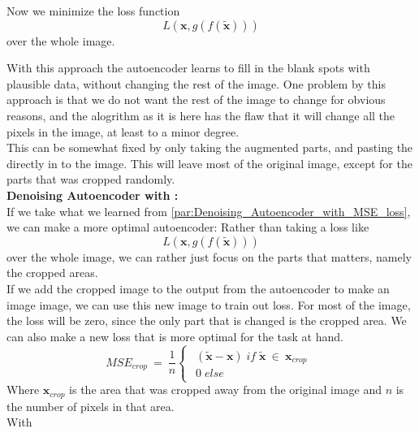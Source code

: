 	Now we minimize the loss function\\	
	  \begin{equation}
	    L(\textbf{x},g(f(\widetilde{\textbf{x}})))
	  \end{equation}
	over the whole image.\\
	\vspace{20px}
	
	With this approach the autoencoder learns to fill in the blank spots with plausible data, without changing the rest of the image. 
	One problem by this approach is that we do not want the rest of the image to change for obvious reasons, and the alogrithm as it is here has the flaw that it will change all the pixels in the image, at 
	least to a minor degree. \\
	
	This can be somewhat fixed by only taking the augmented parts, and pasting the directly in to the image. This will leave most of the original image, except for the parts that was cropped randomly.\\
	
	\vspace{10px}
	\textbf{Denoising Autoencoder with :}\\
	If we take what we learned from \ref{par:Denoising_Autoencoder_with_MSE_loss}, we can make a more optimal autoencoder:
	Rather than taking a loss like 	
	\begin{equation}
	  L(\textbf{x},g(f(\widetilde{\textbf{x}})))
	\end{equation}
	over the whole image, we can rather just focus on the parts that matters, namely the cropped areas.\\
	
	If we add the cropped image to the output from the autoencoder to make an image image, we can use this new image to train out loss.
	For most of the image, the loss will be zero, since the only part that is changed is the cropped area. 
	We can also make a new loss that is more optimal for the task at hand. 
	\begin{equation}
	  MSE_{crop}\:=\: \frac{1}{n}
	  \begin{cases}
	      \begin{array}{lcl}
	      (\widetilde{\textbf{x}}-\textbf{x}) \; if \; \widetilde{\textbf{x}} \: \in \: \textbf{x}_{crop} \\
	      0 \; else
	      \end{array}
	  \end{cases}
	\end{equation}
	Where $\textbf{x}_{crop}$ is the area that was cropped away from the original image and $n$ is the number of pixels in that area.\\
	With
	
